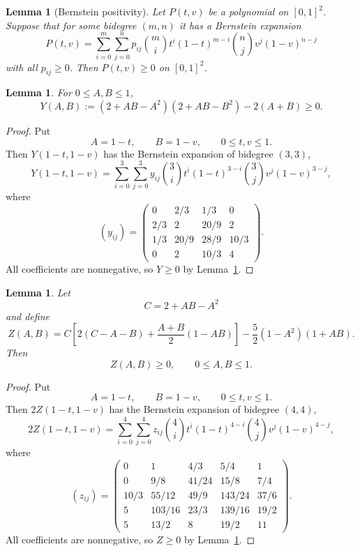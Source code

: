 \documentclass[11pt]{amsart}
\newtheorem{lemma}[theorem]{Lemma}
\theoremstyle{remark}
\numberwithin{equation}{section}
\begin{document}
\begin{lemma}[Bernstein positivity]\label{lem:bernstein}
Let $P(t,v)$ be a polynomial on $[0,1]^2$. Suppose that for some bidegree $(m,n)$ it has a Bernstein expansion
\[
        P(t,v)=\sum_{i=0}^m\sum_{j=0}^n
        p_{ij}\binom mi t^i(1-t)^{m-i}\binom nj v^j(1-v)^{n-j}
\]
with all $p_{ij}\geq 0$. Then $P(t,v)\geq 0$ on $[0,1]^2$.
\end{lemma}

\begin{lemma}\label{lem:bernstein-Y}
For $0\leq A,B\leq 1$,
\[
        Y(A,B):=(2+AB-A^2)(2+AB-B^2)-2(A+B)\geq 0.
\]
\end{lemma}

\begin{proof}
Put
\[
        A=1-t,
        \qquad
        B=1-v,
        \qquad
        0\leq t,v\leq 1.
\]
Then $Y(1-t,1-v)$ has the Bernstein expansion of bidegree $(3,3)$,
\[
        Y(1-t,1-v)=\sum_{i=0}^3\sum_{j=0}^3
        y_{ij}\binom3i t^i(1-t)^{3-i}\binom3j v^j(1-v)^{3-j},
\]
where
\[
        (y_{ij})=
        \begin{pmatrix}
        0 & 2/3 & 1/3 & 0\\
        2/3 & 2 & 20/9 & 2\\
        1/3 & 20/9 & 28/9 & 10/3\\
        0 & 2 & 10/3 & 4
        \end{pmatrix}.
\]
All coefficients are nonnegative, so $Y\geq 0$ by Lemma~\ref{lem:bernstein}.
\end{proof}

\begin{lemma}\label{lem:bernstein-Z}
Let
\[
        C=2+AB-A^2
\]
and define
\[
        Z(A,B)=C\left[2(C-A-B)+\frac{A+B}{2}(1-AB)\right]
        -\frac52(1-A^2)(1+AB).
\]
Then
\[
        Z(A,B)\geq 0,
        \qquad 0\leq A,B\leq 1.
\]
\end{lemma}

\begin{proof}
Put
\[
        A=1-t,
        \qquad
        B=1-v,
        \qquad
        0\leq t,v\leq 1.
\]
Then $2Z(1-t,1-v)$ has the Bernstein expansion of bidegree $(4,4)$,
\[
        2Z(1-t,1-v)=\sum_{i=0}^4\sum_{j=0}^4
        z_{ij}\binom4i t^i(1-t)^{4-i}\binom4j v^j(1-v)^{4-j},
\]
where
\[
        (z_{ij})=
        \begin{pmatrix}
        0 & 1 & 4/3 & 5/4 & 1\\
        0 & 9/8 & 41/24 & 15/8 & 7/4\\
        10/3 & 55/12 & 49/9 & 143/24 & 37/6\\
        5 & 103/16 & 23/3 & 139/16 & 19/2\\
        5 & 13/2 & 8 & 19/2 & 11
        \end{pmatrix}.
\]
All coefficients are nonnegative, so $Z\geq 0$ by Lemma~\ref{lem:bernstein}.
\end{proof}
\end{document}

